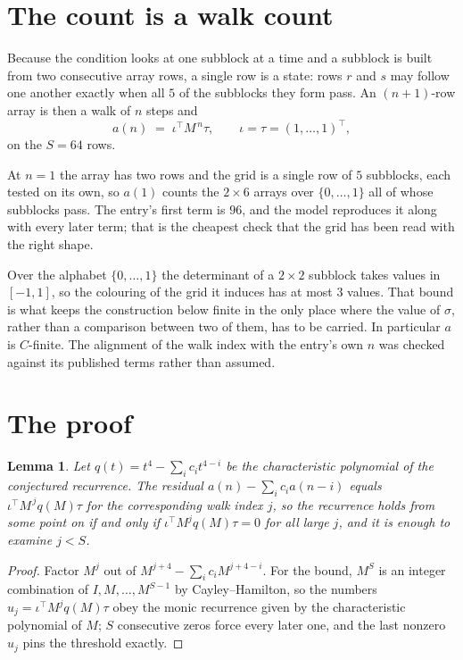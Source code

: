 \documentclass[11pt,a4paper]{article}
\theoremstyle{plain}
\newtheorem{lemma}[theorem]{Lemma}
\theoremstyle{definition}
\begin{document}
\section{The count is a walk count}

Because the condition looks at one subblock at a time and a subblock is
built from two consecutive array rows, a single row is a state: rows $r$ and $s$ may follow one
another exactly when all $5$ of the subblocks they form pass. An $(n+1)$-row array is then a
walk of $n$ steps and
\[
a(n)\;=\;\iota^{\!\top}M^{\,n}\tau,\qquad\iota=\tau=(1,\dots,1)^{\!\top},
\]
on the $S=64$ rows.

At $n=1$ the array has two rows and the grid is a single row of $5$
subblocks, each tested on its own, so $a(1)$ counts the
$2\times6$ arrays over $\{0,\dots,1\}$ all of whose subblocks pass. The entry's
first term is $96$, and the model reproduces it along with every later term; that is the
cheapest check that the grid has been read with the right shape.

Over the alphabet $\{0,\dots,1\}$ the determinant of a $2\times2$ subblock takes values in
$[-1,1]$, so the colouring of the grid it induces has at most $3$ values.
That bound is what keeps the construction below finite in the only place where the value of
$\sigma$, rather than a comparison between two of them, has to be carried.
In particular $a$ is $C$-finite. The alignment of the walk index with the entry's own $n$ was
checked against its published terms rather than assumed.

\section{The proof}

\begin{lemma}\label{lem:crit}
Let $q(t)=t^{4}-\sum_i c_it^{4-i}$ be the characteristic polynomial of the
conjectured recurrence. The residual $a(n)-\sum_ic_ia(n-i)$ equals
$\iota^{\!\top}M^{\,j}q(M)\tau$ for the corresponding walk index $j$, so the recurrence
holds from some point on if and only if $\iota^{\!\top}M^{j}q(M)\tau=0$ for all large $j$,
and it is enough to examine $j<S$.
\end{lemma}

\begin{proof}
Factor $M^{j}$ out of $M^{j+4}-\sum_ic_iM^{j+4-i}$. For the bound, $M^{S}$
is an integer combination of $I,M,\dots,M^{S-1}$ by Cayley--Hamilton, so the numbers
$u_j=\iota^{\!\top}M^{j}q(M)\tau$ obey the monic recurrence given by the characteristic
polynomial of $M$; $S$ consecutive zeros force every later one, and the last nonzero $u_j$
pins the threshold exactly.
\end{proof}
\end{document}
